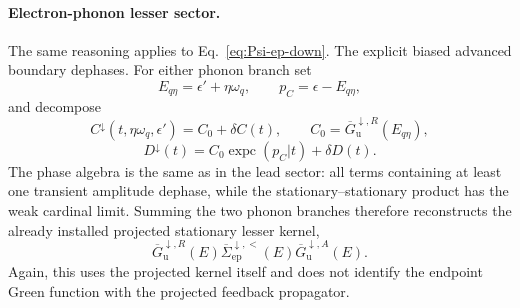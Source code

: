 \documentclass[
 reprint,
 superscriptaddress,
 amsmath,amssymb,
 aps,prb,
 longbibliography,
 floatfix
]{revtex4-2}
\newcommand{\ep}{\mathrm{ep}}
\newcommand{\expc}{\operatorname{expc}}
\newcommand{\barSigma}{\overline{\Sigma}}
\begin{document}
\paragraph{Electron-phonon lesser sector.}
The same reasoning applies to Eq.~\eqref{eq:Psi-ep-down}. The explicit biased advanced boundary dephases. For either phonon branch set
\begin{equation*}
E_{q\eta}=\epsilon'+\eta\omega_q,
\qquad
p_C=\epsilon-E_{q\eta},
\end{equation*}
and decompose
\begin{equation*}
C^\downarrow(t,\eta\omega_q,\epsilon')
=
C_0+\delta C(t),
\qquad
C_0=\overline G_{\mathrm u}^{\downarrow,R}(E_{q\eta}),
\end{equation*}
\begin{equation*}
D^\downarrow(t)
=
C_0\expc(p_C|t)+\delta D(t).
\end{equation*}
The phase algebra is the same as in the lead sector: all terms containing at least one transient amplitude dephase, while the stationary--stationary product has the weak cardinal limit. Summing the two phonon branches therefore reconstructs the already installed projected stationary lesser kernel,
\begin{equation*}
\overline G_{\mathrm u}^{\downarrow,R}(E)
\barSigma_{\ep}^{\downarrow,<}(E)
\overline G_{\mathrm u}^{\downarrow,A}(E).
\end{equation*}
Again, this uses the projected kernel itself and does not identify the endpoint Green function with the projected feedback propagator.
\end{document}
